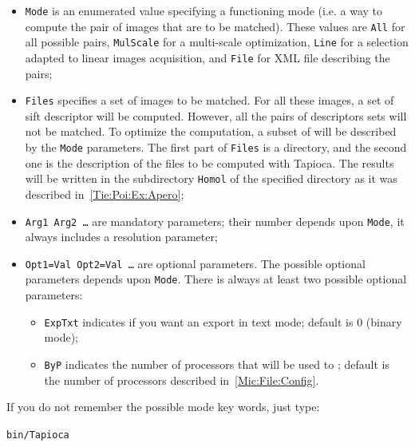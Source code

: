 \begin{itemize}

    \item {\tt Mode} is an enumerated value specifying a functioning mode
	  (i.e. a way to compute the pair of images that are to be matched).
	  These values are {\tt All} for all possible pairs, {\tt MulScale}
	  for a multi-scale optimization, {\tt Line} for a selection adapted
	  to linear images acquisition, and {\tt File} for  XML file
	  describing the pairs;

    \item {\tt Files} specifies a set of images to be matched. For all these
	 images, a set of sift descriptor will be computed. However, all the pairs of
	 descriptors sets will not be  matched. To optimize the computation, a subset
	 of  will be described by the {\tt Mode} parameters.
	 The first part of {\tt Files} is a directory, and the second one is the description
	 of the files to be computed with Tapioca.
	 The results will be written in the subdirectory {\tt Homol} of the
	 specified directory as it was described in~\ref{Tie:Poi:Ex:Apero};



    \item  {\tt Arg1 Arg2  \dots} are mandatory parameters; their number depends
	   upon {\tt Mode}, it always includes a resolution parameter;

    \item  {\tt  Opt1=Val Opt2=Val  \dots} are optional parameters. The possible
	   optional parameters depends upon {\tt Mode}.
	   There is always at least two possible optional parameters:

	    \begin{itemize}
		 \item {\tt ExpTxt} indicates if you want an export in text mode;
		       default is $0$ (binary mode);

		 \item {\tt ByP} indicates the number of processors that will be used
			to ; %
		       default is the number of
			processors described in~\ref{Mic:File:Config}.
	    \end{itemize}

\end{itemize}

If you do not remember the possible mode key words, just type:

\begin{center}
	{\tt bin/Tapioca}
\end{center}

